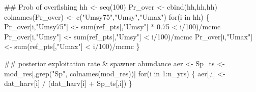 \documentclass[11pt,]{article}
\newenvironment{Shaded}{}{}
\newcommand{\CommentTok}[1]{\textcolor[rgb]{0.00,0.50,0.00}{#1}}
\newcommand{\ControlFlowTok}[1]{\textcolor[rgb]{0.00,0.00,1.00}{#1}}
\newcommand{\DecValTok}[1]{#1}
\newcommand{\FloatTok}[1]{#1}
\newcommand{\KeywordTok}[1]{\textcolor[rgb]{0.00,0.00,1.00}{#1}}
\newcommand{\NormalTok}[1]{#1}
\newcommand{\OperatorTok}[1]{#1}
\newcommand{\StringTok}[1]{\textcolor[rgb]{0.00,0.50,0.50}{#1}}
\begin{document}
\begin{Shaded}
\begin{Highlighting}[]
\CommentTok{## Prob of overfishing}
\NormalTok{hh <-}\StringTok{ }\KeywordTok{seq}\NormalTok{(}\DecValTok{100}\NormalTok{)}
\NormalTok{Pr_over <-}\StringTok{ }\KeywordTok{cbind}\NormalTok{(hh,hh,hh)}
\KeywordTok{colnames}\NormalTok{(Pr_over) <-}\StringTok{ }\KeywordTok{c}\NormalTok{(}\StringTok{"Umsy75"}\NormalTok{,}\StringTok{"Umsy"}\NormalTok{,}\StringTok{"Umax"}\NormalTok{)}
\ControlFlowTok{for}\NormalTok{(i }\ControlFlowTok{in}\NormalTok{ hh) \{}
\NormalTok{  Pr_over[i,}\StringTok{"Umsy75"}\NormalTok{] <-}\StringTok{ }\KeywordTok{sum}\NormalTok{(ref_pts[,}\StringTok{"Umsy"}\NormalTok{] }\OperatorTok{*}\StringTok{ }\FloatTok{0.75} \OperatorTok{<}\StringTok{ }\NormalTok{i}\OperatorTok{/}\DecValTok{100}\NormalTok{)}\OperatorTok{/}\NormalTok{mcmc}
\NormalTok{  Pr_over[i,}\StringTok{"Umsy"}\NormalTok{] <-}\StringTok{ }\KeywordTok{sum}\NormalTok{(ref_pts[,}\StringTok{"Umsy"}\NormalTok{] }\OperatorTok{<}\StringTok{ }\NormalTok{i}\OperatorTok{/}\DecValTok{100}\NormalTok{)}\OperatorTok{/}\NormalTok{mcmc}
\NormalTok{  Pr_over[i,}\StringTok{"Umax"}\NormalTok{] <-}\StringTok{ }\KeywordTok{sum}\NormalTok{(ref_pts[,}\StringTok{"Umax"}\NormalTok{] }\OperatorTok{<}\StringTok{ }\NormalTok{i}\OperatorTok{/}\DecValTok{100}\NormalTok{)}\OperatorTok{/}\NormalTok{mcmc}
\NormalTok{\}}

\CommentTok{## posterior exploitation rate & spawner abundance}
\NormalTok{aer <-}\StringTok{ }\NormalTok{Sp_ts <-}\StringTok{ }\NormalTok{mod_res[,}\KeywordTok{grep}\NormalTok{(}\StringTok{"Sp"}\NormalTok{, }\KeywordTok{colnames}\NormalTok{(mod_res))]}
\ControlFlowTok{for}\NormalTok{(i }\ControlFlowTok{in} \DecValTok{1}\OperatorTok{:}\NormalTok{n_yrs) \{}
\NormalTok{    aer[,i] <-}\StringTok{ }\NormalTok{dat_harv[i] }\OperatorTok{/}\StringTok{ }\NormalTok{(dat_harv[i] }\OperatorTok{+}\StringTok{ }\NormalTok{Sp_ts[,i]) }
\NormalTok{\}}
\end{Highlighting}
\end{Shaded}
\end{document}
